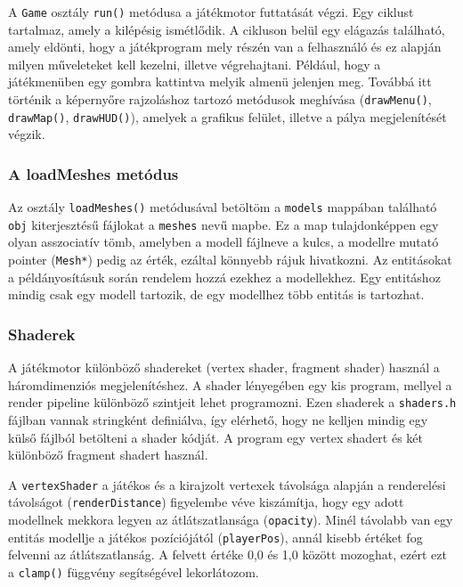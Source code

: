 A \verb|Game| osztály \verb|run()| metódusa a játékmotor futtatását végzi. Egy ciklust tartalmaz, amely a kilépésig ismétlődik. A cikluson belül egy elágazás található, amely eldönti, hogy a játékprogram mely részén van a felhasználó és ez alapján milyen műveleteket kell kezelni, illetve végrehajtani. Például, hogy a játékmenüben egy gombra kattintva melyik almenü jelenjen meg. Továbbá itt történik a képernyőre rajzoláshoz tartozó metódusok meghívása (\verb|drawMenu()|, \verb|drawMap()|, \verb|drawHUD()|), amelyek a grafikus felület, illetve a pálya megjelenítését végzik.

\subsubsection{A loadMeshes metódus}

Az osztály \verb|loadMeshes()| metódusával betöltöm a \verb|models| mappában található \verb|obj| kiterjesztésű fájlokat a \verb|meshes| nevű mapbe. Ez a map tulajdonképpen egy olyan asszociatív tömb, amelyben a modell fájlneve a kulcs, a modellre mutató pointer (\verb|Mesh*|) pedig az érték, ezáltal könnyebb rájuk hivatkozni. Az entitásokat a példányosításuk során rendelem hozzá ezekhez a modellekhez. Egy entitáshoz mindig csak egy modell tartozik, de egy modellhez több entitás is tartozhat.

\subsubsection{Shaderek}

A játékmotor különböző shadereket (vertex shader, fragment shader) használ a háromdimenziós megjelenítéshez. A shader lényegében egy kis program, mellyel a render pipeline különböző szintjeit lehet programozni. Ezen shaderek a \verb|shaders.h| fájlban vannak stringként definiálva, így elérhető, hogy ne kelljen mindig egy külső fájlból betölteni a shader kódját. A program egy vertex shadert és két különböző fragment shadert használ.

A \verb|vertexShader| a játékos és a kirajzolt vertexek távolsága alapján a renderelési távolságot (\verb|renderDistance|) figyelembe véve kiszámítja, hogy egy adott modellnek mekkora legyen az átlátszatlansága (\verb|opacity|). Minél távolabb van egy entitás modellje a játékos pozíciójától (\verb|playerPos|), annál kisebb értéket fog felvenni az átlátszatlanság. A felvett értéke 0,0 és 1,0 között mozoghat, ezért ezt a \verb|clamp()| függvény segítségével lekorlátozom.

